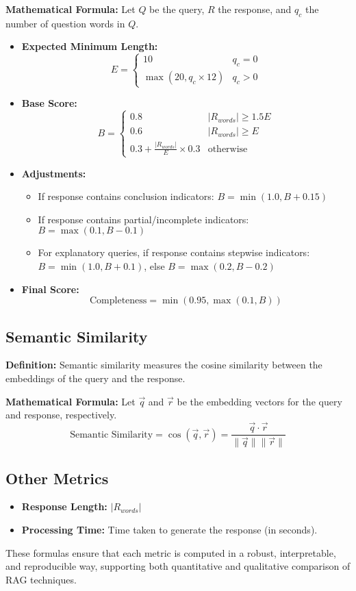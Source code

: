\textbf{Mathematical Formula:}
Let $Q$ be the query, $R$ the response, and $q_c$ the number of question words in $Q$.
\begin{itemize}
    \item \textbf{Expected Minimum Length:}
    \[
    E = \begin{cases}
        10 & q_c = 0 \\
        \max(20, q_c \times 12) & q_c > 0
    \end{cases}
    \]
    \item \textbf{Base Score:}
    \[
    B =
    \begin{cases}
        0.8 & |R_{words}| \geq 1.5E \\
        0.6 & |R_{words}| \geq E \\
        0.3 + \frac{|R_{words}|}{E} \times 0.3 & \text{otherwise}
    \end{cases}
    \]
    \item \textbf{Adjustments:}
    \begin{itemize}
        \item If response contains conclusion indicators: $B = \min(1.0, B + 0.15)$
        \item If response contains partial/incomplete indicators: $B = \max(0.1, B - 0.1)$
        \item For explanatory queries, if response contains stepwise indicators: $B = \min(1.0, B + 0.1)$, else $B = \max(0.2, B - 0.2)$
    \end{itemize}
    \item \textbf{Final Score:}
    \[
    \text{Completeness} = \min(0.95, \max(0.1, B))
    \]
\end{itemize}

\subsection{Semantic Similarity}
\textbf{Definition:} Semantic similarity measures the cosine similarity between the embeddings of the query and the response.

\textbf{Mathematical Formula:}
Let $\vec{q}$ and $\vec{r}$ be the embedding vectors for the query and response, respectively.
\[
\text{Semantic Similarity} = \cos(\vec{q}, \vec{r}) = \frac{\vec{q} \cdot \vec{r}}{\|\vec{q}\| \|\vec{r}\|}
\]

\subsection{Other Metrics}
\begin{itemize}
    \item \textbf{Response Length:} $|R_{words}|$
    \item \textbf{Processing Time:} Time taken to generate the response (in seconds).
\end{itemize}

These formulas ensure that each metric is computed in a robust, interpretable, and reproducible way, supporting both quantitative and qualitative comparison of RAG techniques.

